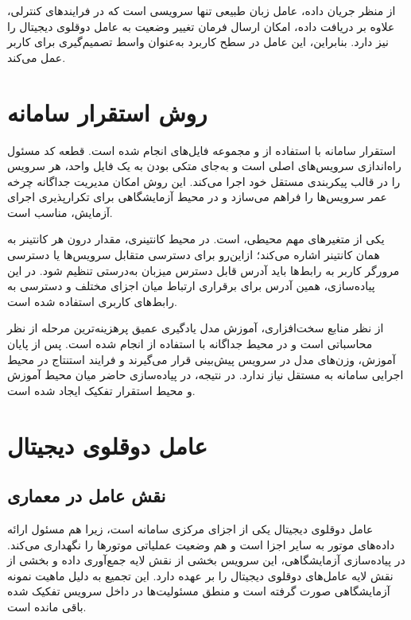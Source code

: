 \documentclass[a4paper,fleqn]{report}
\begin{document}
از منظر جریان داده، عامل زبان طبیعی تنها سرویسی است که در فرایندهای کنترلی، علاوه بر دریافت داده، امکان ارسال فرمان تغییر وضعیت به عامل دوقلوی دیجیتال را نیز دارد. بنابراین، این عامل در سطح کاربرد به‌عنوان واسط تصمیم‌گیری برای کاربر عمل می‌کند.



\section{روش استقرار سامانه}
\label{sec:deployment}

استقرار سامانه با استفاده از  و مجموعه فایل‌های  انجام شده است. قطعه کد  مسئول راه‌اندازی سرویس‌های اصلی است و به‌جای متکی بودن به یک فایل واحد، هر سرویس را در قالب پیکربندی مستقل خود اجرا می‌کند. این روش امکان مدیریت جداگانه چرخه عمر سرویس‌ها را فراهم می‌سازد و در محیط آزمایشگاهی برای تکرارپذیری اجرای آزمایش، مناسب است.

یکی از متغیرهای مهم محیطی،  است. در محیط کانتینری، مقدار  درون هر کانتینر به همان کانتینر اشاره می‌کند؛ ازاین‌رو برای دسترسی متقابل سرویس‌ها یا دسترسی مرورگر کاربر به رابط‌ها باید آدرس قابل دسترس میزبان به‌درستی تنظیم شود. در این پیاده‌سازی، همین آدرس برای برقراری ارتباط میان اجزای مختلف و دسترسی به رابط‌های کاربری استفاده شده است.

از نظر منابع سخت‌افزاری، آموزش مدل یادگیری عمیق پرهزینه‌ترین مرحله از نظر محاسباتی است و در محیط جداگانه با استفاده از  انجام شده است. پس از پایان آموزش، وزن‌های مدل در سرویس پیش‌بینی قرار می‌گیرند و فرایند استنتاج در محیط اجرایی سامانه به  مستقل نیاز ندارد. در نتیجه، در پیاده‌سازی حاضر میان محیط آموزش و محیط استقرار تفکیک ایجاد شده‌ است.


\section{عامل دوقلوی دیجیتال}
\label{sec:impl-dtwin}

\subsection{نقش عامل در معماری}

عامل دوقلوی دیجیتال یکی از اجزای مرکزی سامانه است، زیرا هم مسئول ارائه داده‌های موتور به سایر اجزا است و هم وضعیت عملیاتی موتورها را نگهداری می‌کند. در پیاده‌سازی آزمایشگاهی، این سرویس بخشی از نقش لایه جمع‌آوری داده و بخشی از نقش لایه عامل‌های دوقلوی دیجیتال را بر عهده دارد. این تجمیع به دلیل ماهیت نمونه آزمایشگاهی صورت گرفته است و منطق مسئولیت‌ها در داخل سرویس تفکیک شده باقی مانده است.
\end{document}
